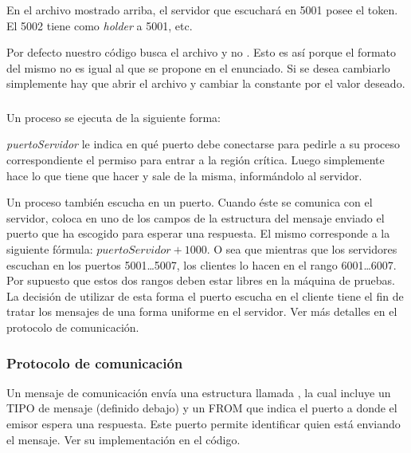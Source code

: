 En el archivo mostrado arriba, el servidor que escuchará en 5001 posee el token.
El 5002 tiene como \emph{holder} a 5001, etc.

Por defecto nuestro código busca el archivo  
 y no . Esto es así porque el formato del mismo 
no es igual al que se propone en el enunciado. Si se desea cambiarlo simplemente 
hay que abrir el archivo  y cambiar la constante
 por el valor deseado.


\subsubsection{}

Un proceso  se ejecuta de la siguiente forma:


\emph{puertoServidor} le indica en qué puerto debe conectarse para pedirle a su
proceso  correspondiente el permiso para entrar a la región
crítica. Luego simplemente hace lo que tiene que hacer y sale de la misma,
informándolo al servidor.

Un proceso  también escucha en un puerto. Cuando éste se
comunica con el servidor, coloca en uno de los campos de la estructura del
mensaje enviado el puerto que ha escogido para esperar una respuesta. El
mismo corresponde a la siguiente fórmula: $puertoServidor + 1000$. O sea que
mientras que los servidores escuchan en los puertos 5001\ldots5007, los clientes
lo hacen en el rango 6001\ldots6007. Por supuesto que estos dos rangos deben
estar libres en la máquina de pruebas. La decisión de utilizar de esta forma el 
puerto escucha en el cliente tiene el fin de tratar los mensajes de una forma
uniforme en el servidor. Ver más detalles en el protocolo de comunicación.


\subsubsection{Protocolo de comunicación}

Un mensaje de comunicación envía una estructura llamada , la cual
incluye un TIPO de mensaje (definido debajo) y un FROM que indica el puerto a
donde el emisor espera una respuesta. Este puerto permite identificar quien está
enviando el mensaje. Ver su implementación en el código.

